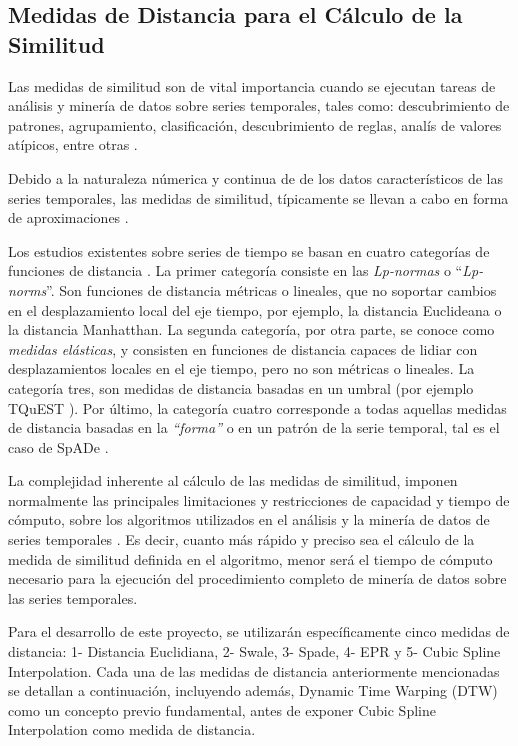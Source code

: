\subsection{Medidas de Distancia para el C\'alculo de la Similitud}
Las medidas de similitud son de vital importancia cuando se ejecutan tareas de an\'alisis y miner\'ia de datos sobre series temporales, tales como: descubrimiento de patrones, agrupamiento, clasificaci\'on, descubrimiento de reglas, anal\'is de valores at\'ipicos, entre otras \cite{concepts}.\par
Debido a la naturaleza n\'umerica y continua de de los datos caracter\'isticos de las series temporales, las medidas de similitud, t\'ipicamente se llevan a cabo en forma de aproximaciones \cite{distancecomparison}.\par
Los estudios existentes sobre series de tiempo se basan en cuatro categor\'ias de funciones de distancia \cite{measurements}. La primer categor\'ia consiste en las \textit{Lp-normas} o \enquote{\textit{Lp-norms}}. Son funciones de distancia m\'etricas o lineales, que no soportar cambios en el desplazamiento local del eje tiempo, por ejemplo, la distancia Euclideana o la distancia Manhatthan. La segunda categor\'ia, por otra parte, se conoce como \textit{medidas el\'asticas}, y consisten en funciones de distancia capaces de lidiar con desplazamientos locales en el eje tiempo, pero no son m\'etricas o lineales. La categor\'ia tres, son medidas de distancia basadas en un umbral (por ejemplo TQuEST \cite{distancecomparison}). Por \'ultimo, la categor\'ia cuatro corresponde a todas aquellas medidas de distancia basadas en la \textit{\enquote{forma}} o en un patr\'on de la serie temporal, tal es el caso de SpADe \cite{spade}. \par
La complejidad inherente al c\'alculo de las medidas de similitud, imponen normalmente las principales limitaciones y restricciones de capacidad y tiempo de c\'omputo, sobre los algoritmos utilizados en el an\'alisis y la miner\'ia de datos de series temporales \cite{algoanalysis}. Es decir, cuanto m\'as r\'apido y preciso sea el c\'alculo de la medida de similitud definida en el algoritmo, menor ser\'a el tiempo de c\'omputo necesario para la ejecuci\'on del procedimiento completo de miner\'ia de datos sobre las series temporales.\par
Para el desarrollo de este proyecto, se utilizar\'an espec\'ificamente cinco medidas de distancia: 1- Distancia Euclidiana, 2- Swale, 3- Spade, 4- EPR y 5- Cubic Spline Interpolation. Cada una de las medidas de distancia anteriormente mencionadas se detallan a continuaci\'on, incluyendo adem\'as, Dynamic Time Warping (DTW) como un concepto previo fundamental, antes de exponer Cubic Spline Interpolation como medida de distancia.
